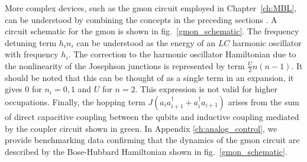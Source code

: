 More complex devices, such as the gmon circuit employed in Chapter~\ref{ch:MBL}, can be understood by combining the concepts in the preceding sections \cite{Neill2018}.
A circuit schematic for the gmon is shown in fig.~\ref{gmon_schematic}.
The frequency detuning term $h_i n_i$ can be understood as the energy of an $LC$ harmonic oscillator with frequency $h_i$.
The correction to the harmonic oscillator Hamiltonian due to the nonlinearity of the Josephson junctions is represented by term $\frac{U}{2} n (n-1)$.
It should be noted that this can be thought of as a single term in an expansion, it gives $0$ for $n_i = 0, 1$ and $U$ for $n=2$.
This expression is not valid for higher occupations.
Finally, the hopping term $J (a_i a_{i+1}^\dagger + a_i^\dagger a_{i+1})$
arises from the sum of direct capacitive coupling between the qubits and inductive coupling mediated by the coupler circuit shown in green.
In Appendix \ref{ch:analog_control}, we provide benchmarking data confirming that the dynamics of the gmon circuit are described by the Bose-Hubbard Hamiltonian shown in fig.~\ref{gmon_schematic}.


